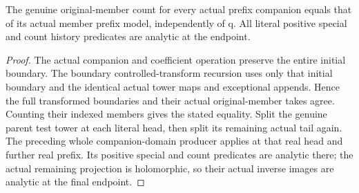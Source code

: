 \begin{lemma}
\label{hir:member-companion-positive-prefix-geometry}
\leanok
The genuine original-member count for every actual prefix companion equals
that of its actual member prefix model, independently of q. All literal
positive special and count history predicates are analytic at the endpoint.
\end{lemma}
\begin{proof}
The actual companion and coefficient operation preserve the entire initial
boundary. The boundary controlled-transform recursion uses only that initial
boundary and the identical actual tower maps and exceptional appends. Hence
the full transformed boundaries and their actual original-member takes agree.
Counting their indexed members gives the stated equality. Split the genuine
parent test tower at each literal head, then split its remaining actual tail
again. The preceding whole companion-domain producer applies at that real
head and further real prefix. Its positive special and count predicates are
analytic there; the actual remaining projection is holomorphic, so their
actual inverse images are analytic at the final endpoint.
\end{proof}

